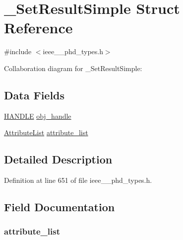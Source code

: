 \hypertarget{struct___set_result_simple}{}\section{\+\_\+\+Set\+Result\+Simple Struct Reference}
\label{struct___set_result_simple}


{\ttfamily \#include $<$ieee\+\_\+\_\+phd\+\_\+types.\+h$>$}



Collaboration diagram for \+\_\+\+Set\+Result\+Simple\+:
\subsection*{Data Fields}
\begin{DoxyCompactItemize}
\item 
\hyperlink{ieee__11073__phd__types_8h_a76f0d44d294babf2e568f7ee676ffca6}{H\+A\+N\+D\+L\+E} \hyperlink{struct___set_result_simple_abbfff52b7a4956021522f5750c4b32c6}{obj\+\_\+handle}
\item 
\hyperlink{ieee__11073__phd__types_8h_a87a34d3be532804006242c172e4beea2}{Attribute\+List} \hyperlink{struct___set_result_simple_a55d9d2bb0279117dc42540f02b5f934c}{attribute\+\_\+list}
\end{DoxyCompactItemize}


\subsection{Detailed Description}


Definition at line 651 of file ieee\+\_\+\_\+phd\+\_\+types.\+h.



\subsection{Field Documentation}
\hypertarget{struct___set_result_simple_a55d9d2bb0279117dc42540f02b5f934c}{}
\subsubsection[{attribute\+\_\+list}]{ attribute\+\_\+list}\label{struct___set_result_simple_a55d9d2bb0279117dc42540f02b5f934c}



